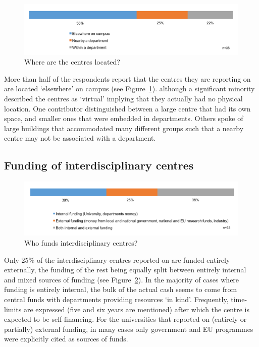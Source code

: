 \begin{figure}[h]
\centering
\includegraphics[width = \linewidth]{charts/5d.png}
\caption{ Where are the centres located?}
\label{sect5:locations}
\end{figure}

More than half of the respondents report that the centres they are reporting on are located `elsewhere' on campus (see Figure~\ref{sect5:locations}). although a significant minority described the centres as `virtual' implying that they actually had no physical location. One contributor distinguished between a large centre that had its own space, and smaller ones that were embedded in departments. Others spoke of large buildings that accommodated many different groups such that a nearby centre may not be associated with a department.

\subsection{Funding of interdisciplinary centres}

\begin{figure}[h]
\centering
\includegraphics[width = \linewidth]{charts/5e.png}
\caption{Who funds interdisciplinary centres?}
\label{sect5:funding}
\end{figure}

Only 25\% of the interdisciplinary centres reported on are funded entirely externally, the funding of the rest being equally split between entirely internal and mixed sources of funding (see Figure~\ref{sect5:funding}). In the majority of cases where funding is entirely internal, the bulk of the actual cash seems to come from central funds with departments providing resources `in kind'. Frequently, time-limits are expressed (five and six years are mentioned) after which the centre is expected to be self-financing. For the universities that reported on (entirely or partially) external funding, in many cases only government and EU programmes were explicitly cited as sources of funds.


